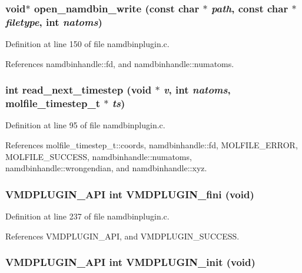 \subsubsection{\setlength{\rightskip}{0pt plus 5cm}void$\ast$ open\_\-namdbin\_\-write (const char $\ast$ {\em path}, const char $\ast$ {\em filetype}, int {\em natoms})\hspace{0.3cm}{\tt  [static]}}\label{namdbinplugin_8c_a4}




Definition at line 150 of file namdbinplugin.c.

References namdbinhandle::fd, and namdbinhandle::numatoms.
\subsubsection{\setlength{\rightskip}{0pt plus 5cm}int read\_\-next\_\-timestep (void $\ast$ {\em v}, int {\em natoms}, {\bf molfile\_\-timestep\_\-t} $\ast$ {\em ts})\hspace{0.3cm}{\tt  [static]}}\label{namdbinplugin_8c_a2}




Definition at line 95 of file namdbinplugin.c.

References molfile\_\-timestep\_\-t::coords, namdbinhandle::fd, MOLFILE\_\-ERROR, MOLFILE\_\-SUCCESS, namdbinhandle::numatoms, namdbinhandle::wrongendian, and namdbinhandle::xyz.
\subsubsection{\setlength{\rightskip}{0pt plus 5cm}VMDPLUGIN\_\-API int VMDPLUGIN\_\-fini (void)}\label{namdbinplugin_8c_a9}




Definition at line 237 of file namdbinplugin.c.

References VMDPLUGIN\_\-API, and VMDPLUGIN\_\-SUCCESS.
\subsubsection{\setlength{\rightskip}{0pt plus 5cm}VMDPLUGIN\_\-API int VMDPLUGIN\_\-init (void)}\label{namdbinplugin_8c_a7}





